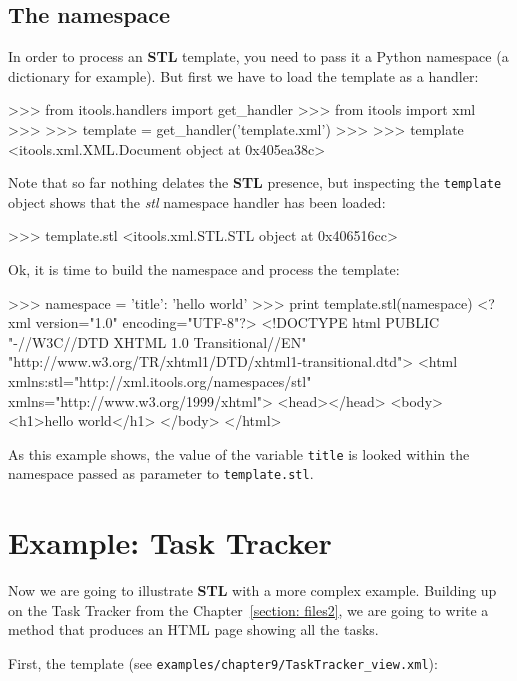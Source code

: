 \subsection{The namespace}

In order to process an {\bf STL} template, you need to pass it a Python
namespace (a dictionary for example). But first we have to load the template
as a handler:

\begin{code}
    >>> from itools.handlers import get_handler
    >>> from itools import xml
    >>>   
    >>> template = get_handler('template.xml')
    >>> 
    >>> template
    <itools.xml.XML.Document object at 0x405ea38c>
\end{code}

Note that so far nothing delates the {\bf STL} presence, but inspecting
the {\tt template} object shows that the {\em stl} namespace handler has
been loaded:

\begin{code}
    >>> template.stl
    <itools.xml.STL.STL object at 0x406516cc>
\end{code}

Ok, it is time to build the namespace and process the template:

\begin{code}
    >>> namespace = {'title': 'hello world'}
    >>> print template.stl(namespace)
    <?xml version="1.0" encoding="UTF-8"?>
    <!DOCTYPE html
         PUBLIC "-//W3C//DTD XHTML 1.0 Transitional//EN"
        "http://www.w3.org/TR/xhtml1/DTD/xhtml1-transitional.dtd">
    <html xmlns:stl="http://xml.itools.org/namespaces/stl"
          xmlns="http://www.w3.org/1999/xhtml">
      <head></head>
      <body>
        <h1>hello world</h1>
      </body>
    </html>
\end{code}


As this example shows, the value of the variable {\tt title} is looked within
the namespace passed as parameter to {\tt template.stl}.


\section{Example: Task Tracker}

Now we are going to illustrate {\bf STL} with a more complex example.
Building up on the Task Tracker from the Chapter~\ref{section: files2},
we are going to write a method that produces an HTML page showing all
the tasks.

First, the template (see {\tt examples/chapter9/TaskTracker\_view.xml}):


